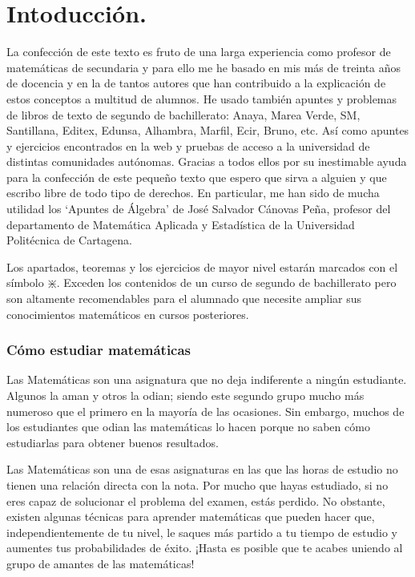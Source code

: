 \section{Intoducción.}

La confección de este texto es fruto de una larga experiencia como profesor de matemáticas de secundaria y para ello me he basado en mis más de treinta años de docencia  y en la de tantos autores que han contribuido a la explicación de estos conceptos a multitud de alumnos. He usado también apuntes y problemas de libros de texto de segundo de bachillerato: Anaya, Marea Verde, SM, Santillana, Editex, Edunsa, Alhambra, Marfil, Ecir, Bruno, etc. Así como apuntes y ejercicios encontrados en la web y pruebas de acceso a la universidad de distintas comunidades autónomas. Gracias a todos ellos por su inestimable ayuda para la confección de este pequeño texto que espero que sirva a alguien y que escribo libre de todo tipo de derechos. En particular, me han sido de mucha utilidad los `Apuntes de Álgebra' de José Salvador Cánovas Peña, profesor del departamento de Matemática Aplicada y Estadística de la Universidad Politécnica de Cartagena.

Los apartados, teoremas y los ejercicios de mayor nivel estarán marcados con el símbolo $\divideontimes$. Exceden los contenidos de un curso de segundo de bachillerato pero son altamente recomendables para el alumnado que necesite ampliar sus conocimientos matemáticos en cursos posteriores.


\subsubsection{Cómo estudiar matemáticas}

 
Las Matemáticas son una asignatura que no deja indiferente a ningún estudiante. Algunos la aman y otros la odian; siendo este segundo grupo mucho más numeroso que el primero en la mayoría de las ocasiones. Sin embargo, muchos de los estudiantes que odian las matemáticas lo hacen porque no saben cómo estudiarlas para obtener buenos resultados.

Las Matemáticas son una de esas asignaturas en las que las horas de estudio no tienen una relación directa con la nota. Por mucho que hayas estudiado, si no eres capaz de solucionar el problema del examen, estás perdido. No obstante, existen algunas técnicas para aprender matemáticas que pueden hacer que, independientemente de tu nivel, le saques más partido a tu tiempo de estudio y aumentes tus probabilidades de éxito. ¡Hasta es posible que te acabes uniendo al grupo de amantes de las matemáticas!

